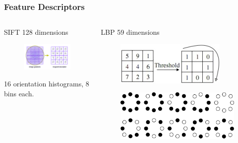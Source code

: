 \documentclass{beamer}
\begin{document}


\begin{frame}
\frametitle{Feature Descriptors}
\begin{columns}
\begin{column}{.3\textwidth}
\begin{block}{SIFT}
128 dimensions
\begin{figure}
\includegraphics[width=\textwidth]{SIFT}
\end{figure}
16 orientation histograms, 8 bins each.
\end{block}
\end{column}
\pause
\begin{column}{.3\textwidth}
\begin{block}{LBP}
59 dimensions
\begin{figure}
\includegraphics[width=\textwidth]{LBPSimple}
\end{figure}
\begin{figure}
\includegraphics[width=\textwidth]{LBPU2}

\end{figure}
\end{block}
\end{column}
\end{columns}
\end{frame}
\end{document}
